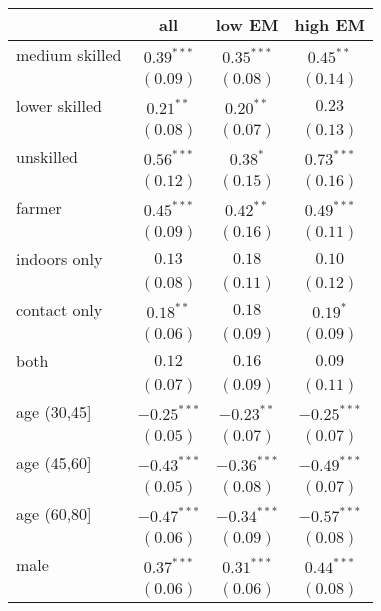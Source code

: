 
\begin{table}
\begin{center}
\begin{small}
\begin{tabular}{l c c c}
\hline
 & all & low EM & high EM \\
\hline
medium skilled & $0.39^{***}$  & $0.35^{***}$  & $0.45^{**}$   \\
               & $(0.09)$      & $(0.08)$      & $(0.14)$      \\
lower skilled  & $0.21^{**}$   & $0.20^{**}$   & $0.23$        \\
               & $(0.08)$      & $(0.07)$      & $(0.13)$      \\
unskilled      & $0.56^{***}$  & $0.38^{*}$    & $0.73^{***}$  \\
               & $(0.12)$      & $(0.15)$      & $(0.16)$      \\
farmer         & $0.45^{***}$  & $0.42^{**}$   & $0.49^{***}$  \\
               & $(0.09)$      & $(0.16)$      & $(0.11)$      \\
indoors only   & $0.13$        & $0.18$        & $0.10$        \\
               & $(0.08)$      & $(0.11)$      & $(0.12)$      \\
contact only   & $0.18^{**}$   & $0.18$        & $0.19^{*}$    \\
               & $(0.06)$      & $(0.09)$      & $(0.09)$      \\
both           & $0.12$        & $0.16$        & $0.09$        \\
               & $(0.07)$      & $(0.09)$      & $(0.11)$      \\
age (30,45]    & $-0.25^{***}$ & $-0.23^{**}$  & $-0.25^{***}$ \\
               & $(0.05)$      & $(0.07)$      & $(0.07)$      \\
age (45,60]    & $-0.43^{***}$ & $-0.36^{***}$ & $-0.49^{***}$ \\
               & $(0.05)$      & $(0.08)$      & $(0.07)$      \\
age (60,80]    & $-0.47^{***}$ & $-0.34^{***}$ & $-0.57^{***}$ \\
               & $(0.06)$      & $(0.09)$      & $(0.08)$      \\
male           & $0.37^{***}$  & $0.31^{***}$  & $0.44^{***}$  \\
               & $(0.06)$      & $(0.06)$      & $(0.08)$      \\

\end{tabular}
\end{small}
\end{center}
\end{table}
